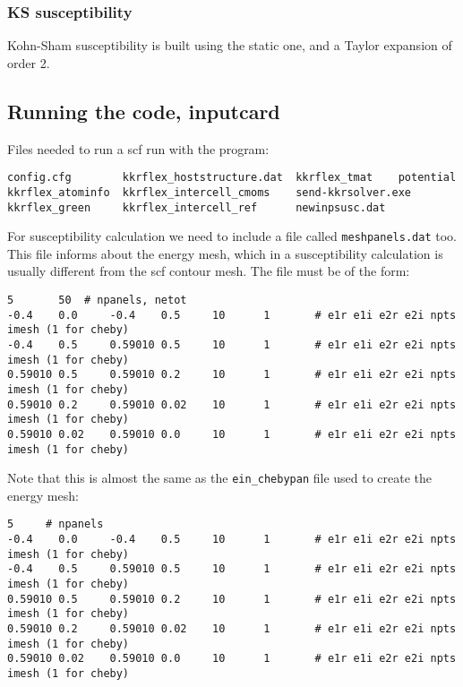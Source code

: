 \documentclass[11pt,fleqn]{book} %
\begin{document}
\subsubsection{KS susceptibility}


Kohn-Sham susceptibility is built using the static one, and a Taylor expansion of order 2.



\newpage

\subsection{Running the code, inputcard}

Files needed to run a scf run with the program:
\begin{VBox}
\begin{verbatim}
config.cfg        kkrflex_hoststructure.dat  kkrflex_tmat    potential
kkrflex_atominfo  kkrflex_intercell_cmoms    send-kkrsolver.exe
kkrflex_green     kkrflex_intercell_ref      newinpsusc.dat
\end{verbatim}
\end{VBox}

For susceptibility calculation we need to include a file called
\verb|meshpanels.dat| too. This file informs about the energy mesh,
which in a susceptibility calculation is usually different from the scf
contour mesh. The file must be of the form:
\begin{VBox}
\begin{verbatim}
5       50  # npanels, netot
-0.4    0.0     -0.4    0.5     10      1       # e1r e1i e2r e2i npts imesh (1 for cheby)
-0.4    0.5     0.59010 0.5     10      1       # e1r e1i e2r e2i npts imesh (1 for cheby)
0.59010 0.5     0.59010 0.2     10      1       # e1r e1i e2r e2i npts imesh (1 for cheby)
0.59010 0.2     0.59010 0.02    10      1       # e1r e1i e2r e2i npts imesh (1 for cheby)
0.59010 0.02    0.59010 0.0     10      1       # e1r e1i e2r e2i npts imesh (1 for cheby)
\end{verbatim}
\end{VBox}
Note that this is almost the same as the \verb|ein_chebypan| file used to
create the energy mesh:
\begin{VBox}
\begin{verbatim}
5     # npanels
-0.4    0.0     -0.4    0.5     10      1       # e1r e1i e2r e2i npts imesh (1 for cheby)
-0.4    0.5     0.59010 0.5     10      1       # e1r e1i e2r e2i npts imesh (1 for cheby)
0.59010 0.5     0.59010 0.2     10      1       # e1r e1i e2r e2i npts imesh (1 for cheby)
0.59010 0.2     0.59010 0.02    10      1       # e1r e1i e2r e2i npts imesh (1 for cheby)
0.59010 0.02    0.59010 0.0     10      1       # e1r e1i e2r e2i npts imesh (1 for cheby)
\end{verbatim}
\end{VBox}
\end{document}

